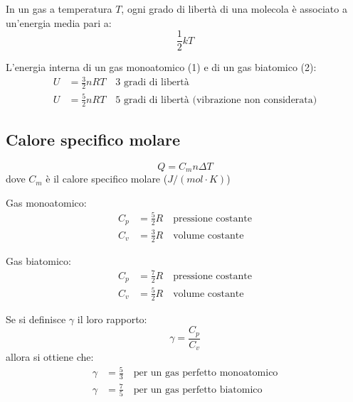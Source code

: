 \documentclass[12pt]{article}
\begin{document}
\vspace{1em}

In un gas a temperatura $T$, ogni grado di libertà di una molecola è associato a un'energia media pari a:
$$ \frac{1}{2}kT $$

\vspace{1em}

L'energia interna di un gas monoatomico (1) e di un gas biatomico (2):
\begin{align}
    U &= \frac{3}{2}nRT \hspace{1em} \text{3 gradi di libertà}\\
    U &= \frac{5}{2}nRT \hspace{1em} \text{5 gradi di libertà (vibrazione non considerata)}
\end{align}


\subsection{Calore specifico molare}
$$ Q = C_mn\Delta T $$
dove $C_m$ è il calore specifico molare ($J/(mol \cdot K)$)

\vspace{1em}

Gas monoatomico: 
\begin{align*}
    C_p &= \frac{5}{2}R \hspace{1em} \text{pressione costante} \\
    C_v &= \frac{3}{2}R \hspace{1em} \text{volume costante}
\end{align*}

\vspace{1em}

Gas biatomico:
\begin{align*}
    C_p &= \frac{7}{2}R \hspace{1em} \text{pressione costante} \\
    C_v &= \frac{5}{2}R \hspace{1em} \text{volume costante}
\end{align*}

Se si definisce $\gamma$ il loro rapporto:
$$ \gamma = \frac{C_p}{C_v} $$
allora si ottiene che:
\begin{align*}
    \gamma &= \frac{5}{3} \hspace{1em} \text{per un gas perfetto monoatomico} \\
    \gamma &= \frac{7}{5} \hspace{1em} \text{per un gas perfetto biatomico}
\end{align*}
\end{document}
